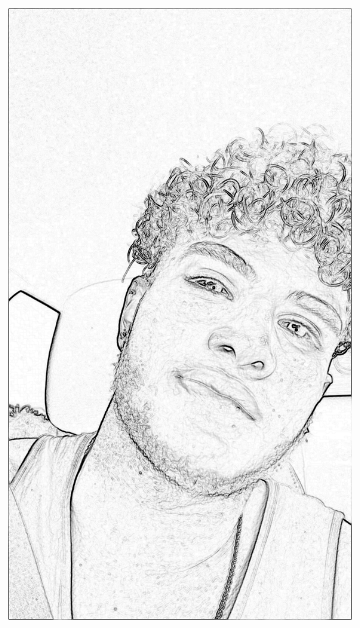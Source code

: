 \documentclass[12pt, a4paper]{article}
\begin{document}
\begin{figure}[!h]
\begin{subfigure}[b]{0.3\textwidth}
  \includegraphics[width=1\textwidth]{report_src/art/fredWhite.jpeg}
\end{subfigure}
\begin{subfigure}[b]{0.3\textwidth}

\end{subfigure}
\end{figure}
\end{document}
